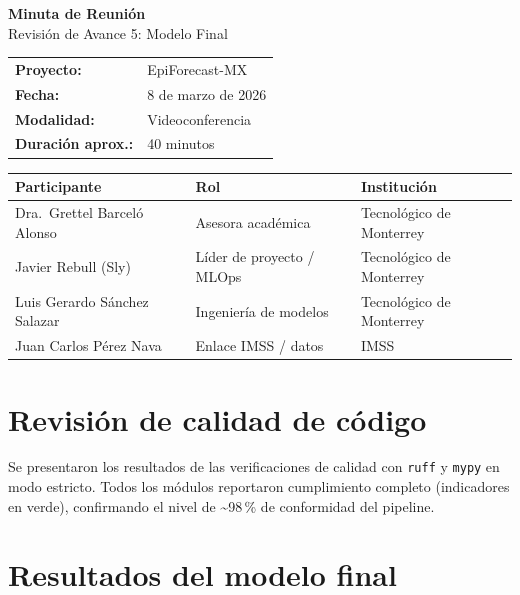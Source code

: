 \documentclass[11pt,letterpaper]{article}
\begin{document}
\begin{center}
    {\Large\bfseries\color{burgundy} Minuta de Reunión}\\[0.3em]
    {\large Revisión de Avance 5: Modelo Final}\\[0.8em]
\end{center}

\noindent
\begin{tabular}{@{}ll}
    \textbf{Proyecto:}      & EpiForecast-MX \\
    \textbf{Fecha:}         & 8 de marzo de 2026 \\
    \textbf{Modalidad:}     & Videoconferencia \\
    \textbf{Duración aprox.:} & 40 minutos \\
\end{tabular}

\vspace{0.8em}

\noindent
\begin{tabular}{@{}lll}
    \toprule
    \textbf{Participante} & \textbf{Rol} & \textbf{Institución} \\
    \midrule
    Dra.\ Grettel Barceló Alonso & Asesora académica & Tecnológico de Monterrey \\
    Javier Rebull (Sly)           & Líder de proyecto / MLOps & Tecnológico de Monterrey \\
    Luis Gerardo Sánchez Salazar  & Ingeniería de modelos      & Tecnológico de Monterrey \\
    Juan Carlos Pérez Nava        & Enlace IMSS / datos        & IMSS \\
    \bottomrule
\end{tabular}

\section{Revisión de calidad de código}

Se presentaron los resultados de las verificaciones de calidad con \texttt{ruff} y \texttt{mypy} en modo estricto. Todos los módulos reportaron cumplimiento completo (indicadores en verde), confirmando el nivel de \textasciitilde98\,\% de conformidad del pipeline.

\section{Resultados del modelo final}
\end{document}
